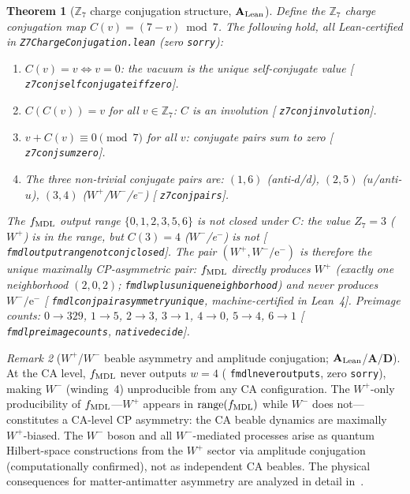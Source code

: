 \documentclass[11pt]{article}
\newtheorem{theorem}{Theorem}[section]
\theoremstyle{remark}
\newtheorem{remark}[theorem]{Remark}
\newcommand{\lean}[1]{%
  \penalty-100
  \begingroup\def\_{\textunderscore\allowbreak}\texttt{#1}\endgroup}
\newcommand{\CatAL}{\ensuremath{\textbf{A}_{\rm Lean}}}
\newcommand{\CatAD}{\textbf{A/D}}
\begin{document}
\begin{theorem}[$\mathbb{Z}_7$ charge conjugation structure, $\CatAL$]
\label{thm:z7_conj}
Define the $\mathbb{Z}_7$ charge conjugation map $C(v) = (7-v)\bmod 7$.
The following hold, all Lean-certified in \lean{Z7Charge\-Conjugation.lean} (zero \texttt{sorry}):
\begin{enumerate}
\item $C(v) = v \iff v = 0$: the vacuum is the unique self-conjugate value
  [\lean{z7\_conj\_self\_conjugate\_iff\_zero}].
\item $C(C(v)) = v$ for all $v \in \mathbb{Z}_7$: $C$ is an involution [\lean{z7\_conj\_involution}].
\item $v + C(v) \equiv 0 \pmod{7}$ for all $v$: conjugate pairs sum to zero [\lean{z7\_conj\_sum\_zero}].
\item The three non-trivial conjugate pairs are: $(1,6)$ (anti-$d$/d), $(2,5)$ ($u$/anti-$u$),
  $(3,4)$ ($W^+$/$W^-$/e$^-$) [\lean{z7\_conj\_pairs}].
\end{enumerate}
The $f_{\rm MDL}$ output range $\{0,1,2,3,5,6\}$ is not closed under $C$: the value $Z_7=3$
($W^+$) is in the range, but $C(3)=4$ ($W^-$/e$^-$) is not
[\lean{fmdl\_output\_range\_not\_conj\_closed}].
The pair $(W^+, W^-/\mathrm{e}^-)$ is therefore the unique maximally CP-asymmetric pair:
$f_{\rm MDL}$ directly produces $W^+$ (exactly one neighborhood $(2,0,2)$;
\lean{fmdl\_w\_plus\_unique\_neighborhood}) and \emph{never} produces $W^-/\mathrm{e}^-$
[\lean{fmdl\_conj\_pair\_asymmetry\_unique}, machine-certified in Lean~4].
Preimage counts: $0\!\to\!329$, $1\!\to\!5$, $2\!\to\!3$, $3\!\to\!1$, $4\!\to\!0$, $5\!\to\!4$, $6\!\to\!1$
[\lean{fmdl\_preimage\_counts}, \lean{native\_decide}].
\end{theorem}

\begin{remark}[$W^+$/$W^-$ beable asymmetry and amplitude conjugation; $\CatAL$/$\CatAD$]
\label{rem:wplus_wminus_beable}
At the CA level, $f_{\rm MDL}$ never outputs $w = 4$
(\lean{fmdl\_never\_outputs\_4}, zero \texttt{sorry}), making $W^-$ (winding~4)
unproducible from any CA configuration.
The $W^+$-only producibility of $f_{\rm MDL}$---$W^+$ appears in
$\mathrm{range}(f_{\rm MDL})$ while $W^-$ does not---constitutes a CA-level CP
asymmetry: the CA beable dynamics are maximally $W^+$-biased.
The $W^-$ boson and all $W^-$-mediated processes arise as quantum Hilbert-space
constructions from the $W^+$ sector via amplitude conjugation (computationally confirmed),
not as independent CA beables.
The physical consequences for matter-antimatter asymmetry are analyzed in
detail in~\cite{SpivackDeeperConsequences}.
\end{remark}
\end{document}
